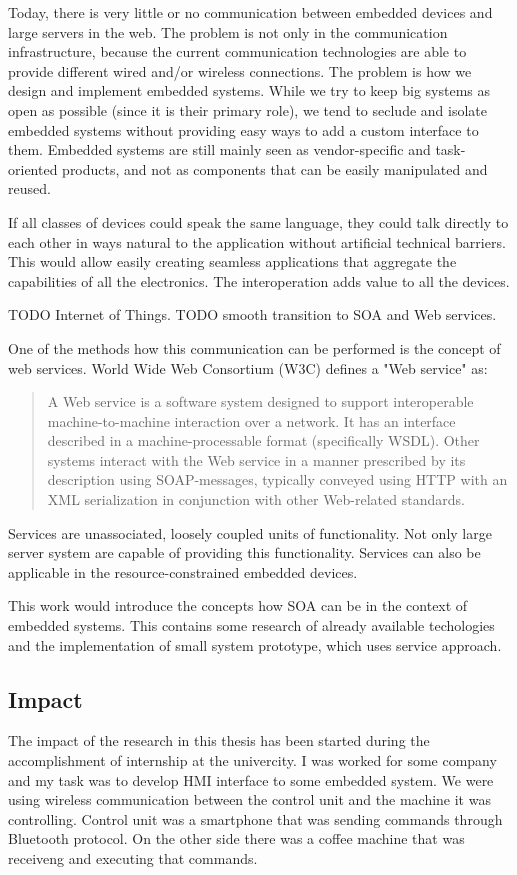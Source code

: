 Today, there is very little or no communication between embedded devices and large servers in the web.
The problem is not only in the communication infrastructure, because the current communication technologies are able to provide different wired and/or wireless connections.
The problem is how we design and implement embedded systems. While we
try to keep big systems as open as possible (since it is their primary role), we tend to seclude and isolate embedded systems without providing easy ways to add a
custom interface to them. Embedded systems are still mainly seen as vendor-specific and task-oriented products, and not as components that can be easily manipulated and reused.

If all classes of devices could speak the same language, they could 
talk directly to each other in ways natural to the application without artificial technical barriers. This would allow easily 
creating seamless applications that aggregate the capabilities of all 
the electronics. The interoperation adds value to all the devices.

TODO Internet of Things.
TODO smooth transition to SOA and Web services.


One of the methods how this communication can be performed is the concept of web services.
World Wide Web Consortium (W3C) defines a "Web service" as: 
\begin{quote}
A Web service is a software system designed to support interoperable machine-to-machine interaction over a network.
It has an interface described in a machine-processable format (specifically
\gls{WSDL}).
Other systems interact with the Web service in a manner prescribed by its
description using \gls{SOAP}-messages, typically conveyed using \gls{HTTP} with
an \gls{XML} serialization in conjunction with other Web-related standards.
\end{quote}

Services are unassociated, loosely coupled units of functionality.
Not only large server system are capable of providing this functionality.
Services can also be applicable in the resource-constrained embedded devices.

This work would introduce the concepts how \gls{SOA} can be in the  context  of 
embedded  systems.
This contains some research of already available techologies and the implementation of small system prototype, which uses service approach.

\subsection{Impact}
The impact of the research in this thesis has been started during the accomplishment of internship at the univercity. 
I was worked for some company and my task was to develop \gls{HMI} interface to some embedded system.
We were using wireless communication between the control unit and the machine it was controlling.
Control unit was a smartphone that was sending commands through Bluetooth protocol.
On the other side there was a coffee machine that was receiveng and executing that commands.


